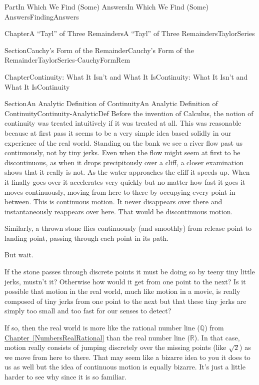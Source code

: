 \documentclass[oneside,10pt,]{book}
\newcommand{\xreffont}{\relax}
\numberwithin{equation}{part}
\newcommand{\RR}{\mathbb {R}}
\newcommand{\QQ}{\mathbb {Q}}
\begin{document}
\begin{partptx}{Part}{In Which We Find (Some) Answers}{}{In Which We Find (Some) Answers}{}{}{FindingAnswers}
\begin{chapterptx}{Chapter}{A ``Tayl'' of Three Remainders}{}{A ``Tayl'' of Three Remainders}{}{}{TaylorSeries}
\begin{sectionptx}{Section}{Cauchy's Form of the Remainder}{}{Cauchy's Form of the Remainder}{}{}{TaylorSeries-CauchyFormRem}
\end{sectionptx}
\end{chapterptx}
%
%
\typeout{************************************************}
\typeout{************************************************}
%
\begin{chapterptx}{Chapter}{Continuity: What It Isn't and What It Is}{}{Continuity: What It Isn't and What It Is}{}{}{Continuity}
\renewcommand*{\chaptername}{Chapter}
%
%
\typeout{************************************************}
\typeout{************************************************}
%
\begin{sectionptx}{Section}{An Analytic Definition of Continuity}{}{An Analytic Definition of Continuity}{}{}{Continuity-AnalyticDef}
Before the invention of Calculus, the notion of continuity was treated intuitively if it was treated at all. This was reasonable because at first pass it seems to be a very simple idea based solidly in our experience of the real world. Standing on the bank we see a river flow past us continuously, not by tiny jerks.  Even when the flow might seem at first to be discontinuous, as when it drops precipitously over a cliff, a closer examination shows that it really is not.  As the water approaches the cliff it speeds up.  When it finally goes over it accelerates very quickly but no matter how fast it goes it moves continuously, moving from here to there by occupying every point in between.  This is continuous motion.  It never disappears over there and instantaneously reappears over here.  That would be discontinuous motion.%
\par
Similarly, a thrown stone flies continuously (and smoothly) from release point to landing point, passing through each point in its path.%
\par
But wait.%
\par
If the stone passes through discrete points it must be doing so by teeny tiny little jerks, mustn't it?  Otherwise how would it get from one point to the next?  Is it possible that motion in the real world, much like motion in a movie, is really composed of tiny jerks from one point to the next but that these tiny jerks are simply too small and too fast for our senses to detect?%
\par
If so, then the real world is more like the rational number line (\(\QQ\)) from \hyperref[NumbersRealRational]{Chapter~{\xreffont\ref{NumbersRealRational}}} than the real number line (\(\RR\)).  In that case, motion really consists of jumping discretely over the missing points (like \(\sqrt{2}\)) as we move from here to there. That may seem like a bizarre idea to you \textemdash{} it does to us as well \textemdash{} but the idea of continuous motion is equally bizarre.  It's just a little harder to see why since it is so familiar.%

\end{sectionptx}
\end{chapterptx}
\end{partptx}
\end{document}
